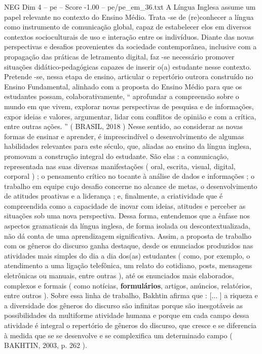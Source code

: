 \begin{textsample}{NEG Dim 4 – pe – Score -1.00 – pe/pe\_em\_36.txt}  \label{ex:f4_neg_019}
A Língua Inglesa assume um papel relevante no contexto do Ensino Médio.
Trata -se de (re)conhecer a língua como instrumento de comunicação global, capaz de estabelecer elos em diversos contextos socioculturais de uso e interação entre os indivíduos.
Diante das novas perspectivas e desafios provenientes da sociedade contemporânea, inclusive com a propagação das práticas de letramento digital, faz -se necessário promover situações didático-pedagógicas capazes de inserir o(a) estudante nesse contexto.
Pretende -se, nessa etapa de ensino, articular o repertório outrora construído no Ensino Fundamental, alinhado com a proposta do Ensino Médio para que os estudantes possam, colaborativamente, “ aprofundar a compreensão sobre o mundo em que vivem, explorar novas perspectivas de pesquisa e de informações, expor ideias e valores, argumentar, lidar com conflitos de opinião e com a crítica, entre outras ações. ” ( BRASIL, 2018 ) Nesse sentido, ao considerar as novas formas de ensinar e aprender, é imprescindível o desenvolvimento de algumas habilidades relevantes para este século, que, aliadas ao ensino da língua inglesa, promovam a construção integral do estudante.
São elas : a comunicação, representada nas suas diversas manifestações ( oral, escrita, visual, digital, corporal ) ; o pensamento crítico no tocante à análise de dados e informações ; o trabalho em equipe cujo desafio concerne no alcance de metas, o desenvolvimento de atitudes proativas e a liderança ; e, finalmente, a criatividade que é compreendida como a capacidade de inovar com ideias, atitudes e perceber as situações sob uma nova perspectiva.
Dessa forma, entendemos que a ênfase nos aspectos gramaticais da língua inglesa, de forma isolada ou descontextualizada, não dá conta de uma aprendizagem significativa.
Assim, a proposta de trabalho com os gêneros do discurso ganha destaque, desde os enunciados produzidos nas atividades mais simples do dia a dia dos(as) estudantes ( como, por exemplo, o atendimento a uma ligação telefônica, um relato do cotidiano, posts, mensagens eletrônicas ou manuais, entre outras ), até os enunciados mais elaborados, complexos e formais ( como notícias, \textbf{formulários}, artigos, anúncios, relatórios, entre outros ).
Sobre essa linha de trabalho, Bakhtin afirma que : [... ] a riqueza e a diversidade dos gêneros do discurso são infinitas porque são inesgotáveis as possibilidades da multiforme atividade humana e porque em cada campo dessa atividade é integral o repertório de gêneros do discurso, que cresce e se diferencia à medida que se se desenvolve e se complexifica um determinado campo ( BAKHTIN, 2003, p. 262 ).

\end{textsample}
